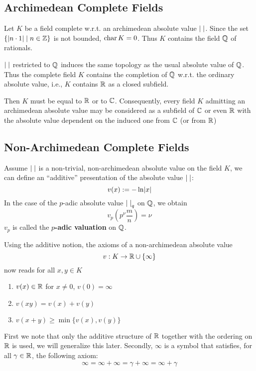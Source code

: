 \documentclass[11pt]{article}
\begin{document}
\subsection{Archimedean Complete Fields}
\label{sec:org5d32c35}
Let \(K\) be a field complete w.r.t. an archimedean absolute value \(\abs{\;}\). Since the
set \(\{\abs{n\cdot 1}\mid n\in\Z\}\) is not bounded, \(\operatorname{char} K=0\). Thus \(K\) contains the field \(\mathbb{Q}\) of
rationals.

\(\abs{\;}\) restricted to \(\mathbb{Q}\) induces the same topology as the usual absolute value of \(\mathbb{Q}\). Thus the
complete field \(K\) contains the completion of \(\mathbb{Q}\) w.r.t. the ordinary absolute value,
i.e., \(K\) contains \(\mathbb{R}\) as a closed subfield.

Then \(K\) must be equal to \(\mathbb{R}\) or to \(\mathbb{C}\). Consequently, every field \(K\) admitting an
archimedean absolute value may be considered as a subfield of \(\mathbb{C}\) or even \(\mathbb{R}\) with the
absolute value dependent on the induced one from \(\mathbb{C}\) (or from \(\mathbb{R}\))

\subsection{Non-Archimedean Complete Fields}
\label{sec:org4a077eb}
Assume \(\abs{\;}\) is a non-trivial, non-archimedean absolute value on the field \(K\), we can
define an ``additive'' presentation of the absolute value \(\abs{\;}\):
\begin{equation*}
v(x):=-\ln\abs{x}
\end{equation*}
In the case of the \(p\)-adic absolute value \(\abs{\;}_q\) on \(\mathbb{Q}\), we obtain
\begin{equation*}
v_p(p^\nu\frac{m}{n})=\nu
\end{equation*}
\(v_p\) is called the \textbf{\(p\)-adic valuation} on \(\mathbb{Q}\).

Using the additive notion, the axioms of a non-archimedean absolute value
\begin{equation*}
v:K\to\mathbb{R}\cup\{\infty\}
\end{equation*}
now reads for all \(x,y\in K\)
\begin{enumerate}
\item \(v(x)\in\mathbb{R}\) for \(x\neq 0\), \(v(0)=\infty\)
\item \(v(xy)=v(x)+v(y)\)
\item \(v(x+y)\ge\min\{v(x),v(y)\}\)
\end{enumerate}

First we note that only the additive structure of \(\mathbb{R}\) together with the ordering on \(\mathbb{R}\) is
used, we will generalize this later. Secondly, \(\infty\) is a symbol that satisfies, for
all \(\gamma\in\mathbb{R}\), the following axiom:
\begin{equation*}
\infty=\infty+\infty=\gamma+\infty=\infty+\gamma
\end{equation*}
\end{document}
